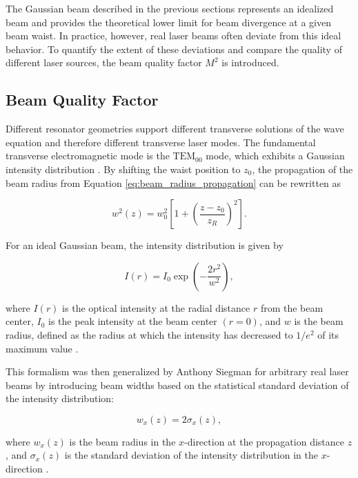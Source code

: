 The Gaussian beam described in the previous sections represents an idealized beam and provides the theoretical lower limit for beam divergence at a given beam waist. In practice, however, real laser beams often deviate from this ideal behavior. To quantify the extent of these deviations and compare the quality of different laser sources, the beam quality factor \(M^2\) is introduced.

\subsection{Beam Quality Factor}

Different resonator geometries support different transverse solutions of the wave equation and therefore different transverse laser modes. The fundamental transverse electromagnetic mode is the \(\mathrm{TEM}_{00}\) mode, which exhibits a Gaussian intensity distribution .
By shifting the waist position to \(z_0\), the propagation of the beam radius from Equation \eqref{eq:beam_radius_propagation} can be rewritten as 

\begin{equation}
w^2(z)=w_0^2\left[1+\left(\frac{z-z_0}{z_R}\right)^2\right].
\end{equation}

For an ideal Gaussian beam, the intensity distribution is given by

\begin{equation}
I(r)=I_0\exp\left(-\frac{2r^2}{w^2}\right),
\end{equation}

where \(I(r)\) is the optical intensity at the radial distance \(r\) from the beam center, \(I_0\) is the peak intensity at the beam center \((r=0)\), and \(w\) is the beam radius, defined as the radius at which the intensity has decreased to \(1/e^2\) of its maximum value .

This formalism was then generalized by Anthony Siegman for arbitrary real laser beams by introducing beam widths based on the statistical standard deviation of the intensity distribution:

\begin{equation}
w_x(z)=2\sigma_x(z),
\end{equation}

where \(w_x(z)\) is the beam radius in the \(x\)-direction at the propagation distance \(z\), and \(\sigma_x(z)\) is the standard deviation of the intensity distribution in the \(x\)-direction .


